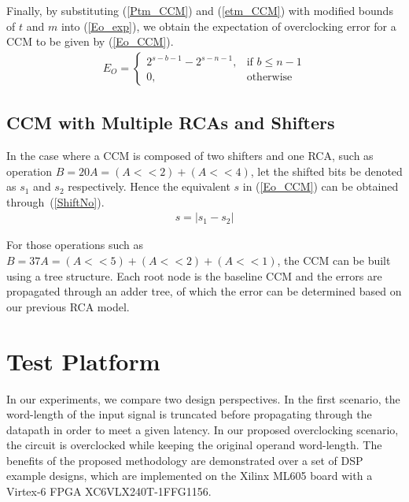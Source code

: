 \documentclass[journal]{IEEEtran}
\begin{document}
Finally, by substituting (\ref{Ptm_CCM}) and (\ref{etm_CCM}) with modified bounds of $t$ and $m$ into (\ref{Eo_exp}), we obtain the expectation of overclocking error for a CCM to be given by (\ref{Eo_CCM}).
%
\begin{eqnarray}\label{Eo_CCM}
      E_O=\left\{
        \begin{matrix}
            2^{s-b-1}-2^{s-n-1}, & \textrm{if $b\leq n-1$}\\
            0, & \textrm{otherwise}
        \end{matrix}
      \right.
\end{eqnarray}

\subsection{CCM with Multiple RCAs and Shifters}\label{CCM_Multi}
In the case where a CCM is composed of two shifters and one RCA, such as operation $\!B\!=\!20A\!=\!(\!A<<2)+(\!A<<4)$, let the shifted bits be denoted as $s_1$ and $s_2$ respectively. Hence the equivalent $s$ in (\ref{Eo_CCM}) can be obtained through~(\ref{ShiftNo}).
%
\begin{eqnarray}\label{ShiftNo}
  s=\left|s_1-s_2\right|
\end{eqnarray}

For those operations such as $B=37A=(A<<5)+(A<<2)+(A<<1)$, the CCM can be built using a tree structure. Each root node is the baseline CCM and the errors are propagated through an adder tree, of which the error can be determined based on our previous RCA model.

\section{Test Platform}\label{Experiment}
In our experiments, we compare two design perspectives. In the first scenario, the word-length of the input signal is truncated before propagating through the datapath in order to meet a given latency. In our proposed overclocking scenario, the circuit is overclocked while keeping the original operand word-length. The benefits of the proposed methodology are demonstrated over a set of DSP example designs, which are implemented on the Xilinx ML605 board with a Virtex-6 FPGA XC6VLX240T-1FFG1156.
\end{document}
